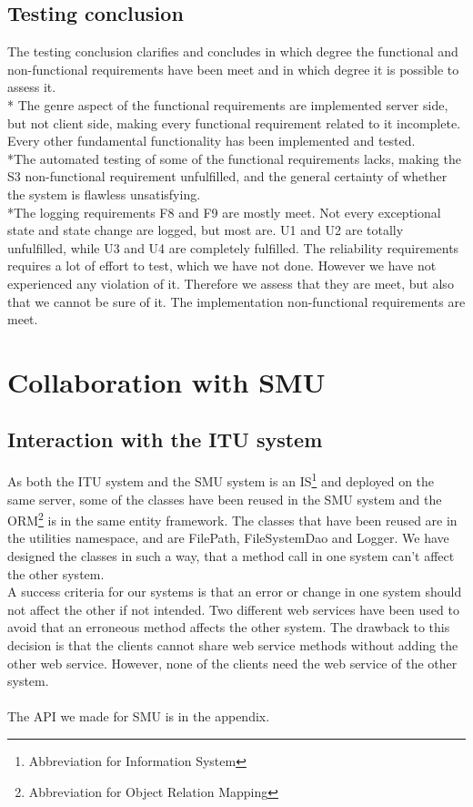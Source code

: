 \documentclass[a4paper,11pt,report]{article}
\begin{document}
\subsection{Testing conclusion}
The testing conclusion clarifies and concludes in which degree the functional and non-functional requirements have been meet and in which degree it is possible to assess it. \\*
The genre aspect of the functional requirements are implemented server side, but not client side, making every functional requirement related to it incomplete. Every other fundamental functionality has been implemented and tested. \\*The automated testing of some of the functional requirements lacks, making the S3 non-functional requirement unfulfilled, and the general certainty of whether the system is flawless unsatisfying.\\*The logging requirements F8 and F9 are mostly meet. Not every exceptional state and state change are logged, but most are. U1 and U2 are totally unfulfilled, while U3 and U4 are completely fulfilled. The reliability requirements requires a lot of effort to test, which we have not done. However we have not experienced any violation of it. Therefore we assess that they are meet, but also that we cannot be sure of it. The implementation non-functional requirements are meet.

\section{Collaboration with SMU}

\subsection{Interaction with the ITU system}
As both the ITU system and the SMU system is an IS\footnote[2]{Abbreviation for Information System} and deployed on the same server, some of the classes have been reused in the SMU system and the ORM\footnote[3]{Abbreviation for Object Relation Mapping} is in the same entity framework.
The classes that have been reused are in the utilities namespace, and are FilePath, FileSystemDao and Logger. We have designed the classes in such a way, that a method call in one system can't affect the other system. \\
A success criteria for our systems is that an error or change in one system should not affect the other if not intended. Two different web services have been used to avoid that an erroneous method affects the other system.
The drawback to this decision is that the clients cannot share web service methods without adding the other web service. However, none of the clients need the web service of the other system. \\ \\
The API we made for SMU is in the appendix.
\end{document}
